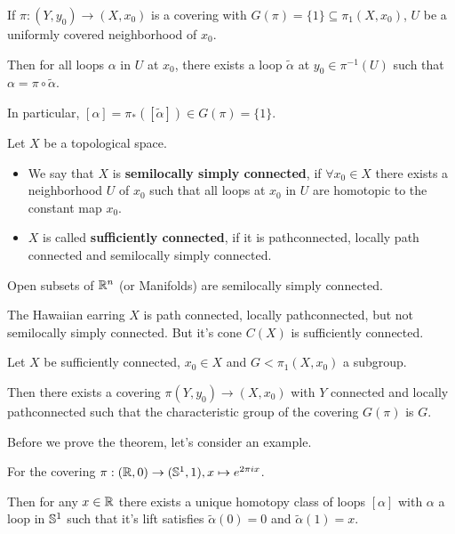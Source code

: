 \begin{rem}[]
  If $\pi:(Y,y_0) \to  (X,x_0)$ is a covering with $G(\pi) = \{1\} \subseteq \pi_1(X,x_0)$, $U$ be a uniformly covered neighborhood of $x_0$.

  Then for all loops $\alpha$ in $U$ at $x_0$, there exists a loop $\tilde{\alpha}$ at $y_0 \in \pi^{-1}(U)$ such that $\alpha = \pi \circ \tilde{\alpha}$.

  In particular, $[\alpha] = \pi_{\ast}([\tilde{\alpha}]) \in G(\pi) = \{1\}$.
\end{rem}


\begin{dfn}[]
Let $X$ be a topological space.
\begin{itemize}
  \item We say that $X$ is \textbf{semilocally simply connected}, if $\forall x_0 \in X$ there exists a neighborhood $U$ of $x_0$ such that all loops at $x_0$ in $U$ are homotopic to the constant map $x_0$.
  \item $X$ is called \textbf{sufficiently connected}, if it is pathconnected, locally path connected and semilocally simply connected.
\end{itemize}
\end{dfn}

\begin{ex}[]
  Open subsets of $\mathbb{R}^{n}$ (or Manifolds) are semilocally simply connected.

  The Hawaiian earring $X$ is path connected, locally pathconnected, but not semilocally simply connected.
  But it's cone $C(X)$ is sufficiently connected.
\end{ex}


\begin{thm} \label{thm:existence-theorem}
  Let $X$ be sufficiently connected, $x_0 \in X$ and $G < \pi_1(X,x_0)$ a subgroup.
  
  Then there exists a covering $\pi(Y,y_0) \to  (X,x_0)$ with $Y$ connected and locally pathconnected such that the characteristic group of the covering $G(\pi)$ is $G$.
\end{thm}

Before we prove the theorem, let's consider an example.

For the covering $\pi: (\mathbb{R},0) \to (\mathbb{S}^{1},1), x \mapsto  e^{2 \pi i x}$.

Then for any $x \in \mathbb{R}$ there exists a unique homotopy class of loops $[\alpha]$ with $\alpha$ a loop in $\mathbb{S}^{1}$ such that it's lift satisfies $\tilde{\alpha}(0) = 0$ and $\tilde{\alpha}(1) = x$.


